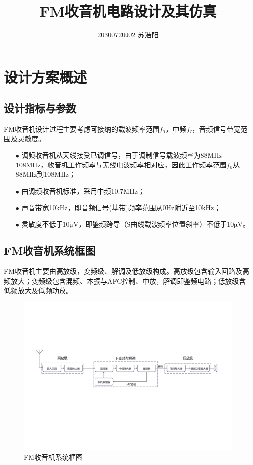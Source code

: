 \documentclass[a4paper,12pt,twoside]{article}
\title{\vspace{-1.5cm}FM收音机电路设计及其仿真}
\author{20300720002 苏浩阳}
\date{}
\begin{document}
\maketitle
\section{设计方案概述}
\subsection{设计指标与参数}
FM收音机设计过程主要考虑可接纳的载波频率范围$f_{0}$，中频$f_{I}$，音频信号带宽范围及灵敏度。

\begin{itemize}
\setlength{\itemsep}{0pt}
\setlength{\parsep}{0pt}
\setlength{\parskip}{0pt}
    \item [$\bullet$]调频收音机从天线接受已调信号，由于调制信号载波频率为88MHz-108MHz，收音机工作频率与无线电波频率相对应，因此工作频率范围$f_0$从88MHz到108MHz；
    \item [$\bullet$]由调频收音机标准，采用中频10.7MHz；
    \item [$\bullet$]声音带宽10kHz，即音频信号(基带)频率范围从0Hz附近至10kHz；
    \item [$\bullet$]灵敏度不低于$10\mathrm{\mu V}$，即鉴频跨导（S曲线载波频率位置斜率）不低于$10\mathrm{\mu V}$。
\end{itemize}

\subsection{FM收音机系统框图}
FM收音机主要由高放级，变频级、解调及低放级构成\cite{1}。高放级包含输入回路及高频放大；变频级包含混频、本振与AFC控制、中放，解调即鉴频电路；低放级含低频放大及低频功放。
\begin{figure}[H]
    \centering
    \includegraphics[scale=0.45]{FM系统框图.pdf}
    \caption{FM收音机系统框图}
    \label{FM框图}
\end{figure}
\end{document}
